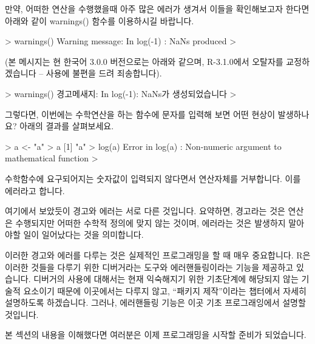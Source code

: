 만약, 어떠한 연산을 수행했을때 아주 많은 에러가 생겨서 이들을 확인해보고자 한다면 아래와 같이 warnings() 함수를 이용하시길 바랍니다. 

\begin{Schunk}
\begin{Soutput}
> warnings()
Warning message:
In log(-1) : NaNs produced
>
\end{Soutput}
\end{Schunk}

(본 메시지는 현 한국어 3.0.0 버전으로는 아래와 같으며, R-3.1.0에서 오탈자를 교정하겠습니다 -- 사용에 불편을 드려 죄송합니다).

\begin{Schunk}
\begin{Soutput}
> warnings()
경고메새지:
In log(-1): NaNs가 생성되었습니다
>
\end{Soutput}
\end{Schunk}


그렇다면, 이번에는 수학연산을 하는 함수에 문자를 입력해 보면 어떤 현상이 발생하나요? 
아래의 결과를 살펴보세요.

\begin{Schunk}
\begin{Soutput}
> a <- "a"
> a
[1] "a"
> log(a)
Error in log(a) : Non-numeric argument to mathematical function
> 
\end{Soutput}
\end{Schunk}

수학함수에 요구되어지는 숫자값이 입력되지 않다면서 연산자체를 거부합니다. 
이를 에러라고 합니다. 

여기에서 보았듯이 경고와 에러는 서로 다른 것입니다.
요약하면, 경고라는 것은 연산은 수행되지만 어떠한 수학적 정의에 맞지 않는 것이며, 에러라는 것은 발생하지 말아야할 일이 일어났다는 것을 의미합니다. 

이러한 경고와 에러를 다루는 것은 실제적인 프로그래밍을 할 때 매우 중요합니다. 
R은 이러한 것들을 다루기 위한 디버거라는 도구와 에러핸들링이라는 기능을 제공하고 있습니다.
디버거의 사용에 대해서는 현재 익숙해지기 위한 기초단계에 해당되지 않는 기술적 요소이기 때문에 이곳에서는 다루지 않고, 
``패키지 제작''이라는 챕터에서 자세히 설명하도록 하겠습니다. 
그러나, 에러핸들링 기능은 이곳 기초 프로그래잉에서 설명할 것입니다. 

본 섹션의 내용을 이해했다면 여러분은 이제 프로그래밍을 시작할 준비가 되었습니다. 


%
%
%

